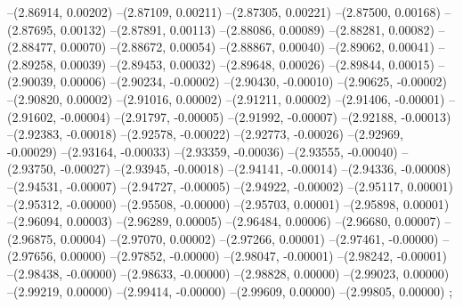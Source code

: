 --(2.86914, 0.00202)
--(2.87109, 0.00211)
--(2.87305, 0.00221)
--(2.87500, 0.00168)
--(2.87695, 0.00132)
--(2.87891, 0.00113)
--(2.88086, 0.00089)
--(2.88281, 0.00082)
--(2.88477, 0.00070)
--(2.88672, 0.00054)
--(2.88867, 0.00040)
--(2.89062, 0.00041)
--(2.89258, 0.00039)
--(2.89453, 0.00032)
--(2.89648, 0.00026)
--(2.89844, 0.00015)
--(2.90039, 0.00006)
--(2.90234, -0.00002)
--(2.90430, -0.00010)
--(2.90625, -0.00002)
--(2.90820, 0.00002)
--(2.91016, 0.00002)
--(2.91211, 0.00002)
--(2.91406, -0.00001)
--(2.91602, -0.00004)
--(2.91797, -0.00005)
--(2.91992, -0.00007)
--(2.92188, -0.00013)
--(2.92383, -0.00018)
--(2.92578, -0.00022)
--(2.92773, -0.00026)
--(2.92969, -0.00029)
--(2.93164, -0.00033)
--(2.93359, -0.00036)
--(2.93555, -0.00040)
--(2.93750, -0.00027)
--(2.93945, -0.00018)
--(2.94141, -0.00014)
--(2.94336, -0.00008)
--(2.94531, -0.00007)
--(2.94727, -0.00005)
--(2.94922, -0.00002)
--(2.95117, 0.00001)
--(2.95312, -0.00000)
--(2.95508, -0.00000)
--(2.95703, 0.00001)
--(2.95898, 0.00001)
--(2.96094, 0.00003)
--(2.96289, 0.00005)
--(2.96484, 0.00006)
--(2.96680, 0.00007)
--(2.96875, 0.00004)
--(2.97070, 0.00002)
--(2.97266, 0.00001)
--(2.97461, -0.00000)
--(2.97656, 0.00000)
--(2.97852, -0.00000)
--(2.98047, -0.00001)
--(2.98242, -0.00001)
--(2.98438, -0.00000)
--(2.98633, -0.00000)
--(2.98828, 0.00000)
--(2.99023, 0.00000)
--(2.99219, 0.00000)
--(2.99414, -0.00000)
--(2.99609, 0.00000)
--(2.99805, 0.00000)
;
